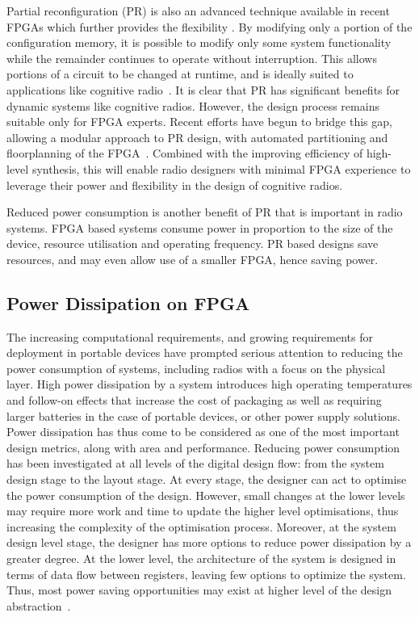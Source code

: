 Partial reconfiguration (PR) is also an advanced technique available in recent FPGAs which further provides the flexibility \cite{Sedcole2006,McDonald2008}.
By modifying only a portion of the configuration memory, it is possible to modify only some system functionality while the remainder continues to operate without interruption.
This allows portions of a circuit to be changed at runtime, and is ideally suited to applications like cognitive radio~\cite{Delahaye2007,Delorme2008}.
It is clear that PR has significant benefits for dynamic systems like cognitive radios.
However, the design process remains suitable only for FPGA experts.
Recent efforts have begun to bridge this gap, allowing a modular approach to PR design, with automated partitioning and floorplanning of the FPGA~\cite{Vipin2012,Vipin2013}.
Combined with the improving efficiency of high-level synthesis, this will enable radio designers with minimal FPGA experience to leverage their power and flexibility in the design of cognitive radios.

Reduced power consumption is another benefit of PR that is important in radio systems.
FPGA based systems consume power in proportion to the size of the device, resource utilisation and operating frequency.
PR based designs save resources, and may even allow use of a smaller FPGA, hence saving power.


\subsection{Power Dissipation on FPGA}
The increasing computational requirements, and growing requirements for deployment in portable devices have prompted serious attention to reducing the power consumption of systems, including radios with a focus on the physical layer.
High power dissipation by a system introduces high operating temperatures and follow-on effects that increase the cost of packaging as well as requiring larger batteries in the case of portable devices, or other power supply solutions.
Power dissipation has thus come to be considered as one of the most important design metrics, along with area and performance.
Reducing power consumption has been investigated at all levels of the digital design flow: from the system design stage to the layout stage.
At every stage, the designer can act to optimise the power consumption of the design.
However, small changes at the lower levels may require more work and time to update the higher level optimisations, thus increasing the complexity of the optimisation process.
Moreover, at the system design level stage, the designer has more options to reduce power dissipation by a greater degree.
At the lower level, the architecture of the system is designed in terms of data flow between registers, leaving few options to optimize the system.
Thus, most power saving opportunities may exist at higher level of the design abstraction~\cite{Raghunathan1998}.

